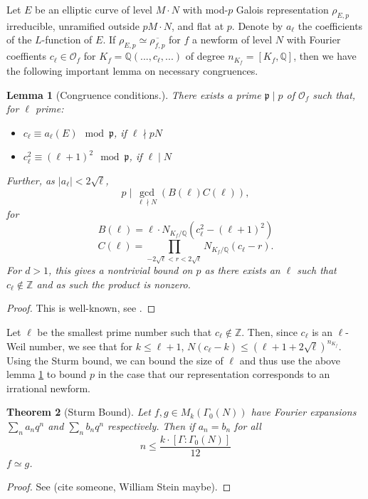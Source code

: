 \documentclass[12pt]{amsart}
\newtheorem{thm}{Theorem}[section]
\newtheorem{lem}[thm]{Lemma}
\theoremstyle{definition}
\def\O{{\mathcal O}}
\def\Q{{\mathbb Q}}
\renewcommand{\bar}{\overline}
\begin{document}
Let $E$ be an elliptic curve of level $M \cdot N$ with mod-$p$ Galois representation $\rho_{E,p}$ irreducible, unramified outside $pM\cdot N$, and flat at $p$.  Denote by $a_\ell$ the coefficients of the $L$-function of $E$.  If $\rho_{E,p} \simeq \bar{\rho_{f,p}}$ for $f$ a newform of level $N$ with Fourier coeffients $c_\ell\in \O_f$ for $K_f = \Q(...,c_\ell,...)$ of degree $n_{K_f} = [K_f,\mathbb{Q}]$, then we have the following important lemma on necessary congruences.

\begin{lem}[Congruence conditions.]\label{ircong1}
There exists a prime $\mathfrak{p} \mid p$ of $\mathcal{O}_f$ such that, for $\ell$ prime:
\begin{itemize}
\item $c_\ell \equiv a_\ell(E) \mod \mathfrak{p}$, if $\ell \nmid pN$
\item $c_\ell^2 \equiv (\ell+1)^2 \mod \mathfrak{p}$, if $\ell \mid N$
\end{itemize}
Further, as $|a_\ell| < 2\sqrt{\ell}$,
\[p \mid \gcd_{\ell \nmid N}(B(\ell)C(\ell)), \] for
\[B(\ell) = \ell \cdot N_{K_f / \mathbb{Q}}(c_\ell^2-(\ell+1)^2) \]
\[C(\ell) = \prod_{-2\sqrt{\ell} < r < 2\sqrt{\ell}}{N_{K_f / \mathbb{Q}}}(c_\ell - r).\]
For $d > 1$, this gives a nontrivial bound on $p$ as there exists an $\ell$ such that $c_\ell \notin \mathbb{Z}$ and as such the product is nonzero.
\end{lem}

\begin{proof}
This is well-known, see \cite{bennett04}.
\end{proof}

Let $\ell$ be the smallest prime number such that $c_\ell \notin \mathbb{Z}$. Then, since $c_\ell$ is an $\ell$-Weil number, we see that for $k \leq \ell+1$, $N(c_\ell - k) \leq (\ell+1 + 2\sqrt{\ell})^{n_{K_f}}$.  Using the Sturm bound, we can bound the size of $\ell$ and thus use the above lemma \ref{ircong1} to bound $p$ in the case that our representation corresponds to an irrational newform.

\begin{thm}[Sturm Bound]\label{sturm}
Let $f,g \in M_k(\Gamma_0(N))$ have Fourier expansions $\sum_n a_nq^n$ and $\sum_n b_n q^n$ respectively.  Then if $a_n = b_n$ for all
\[ n \leq \frac{k \cdot  [\Gamma : \Gamma_0(N)]}{12} \]
$f \simeq g$.
\end{thm}

\begin{proof}
See (cite someone, William Stein maybe).
\end{proof}
\end{document}
